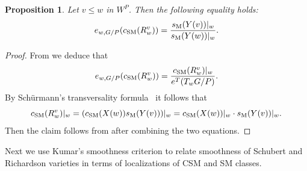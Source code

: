 \documentclass[11pt]{article}
\newtheorem{prop}[theo]{Proposition}
\theoremstyle{definition}
\numberwithin{equation}{section}
\newcommand{\csm}{c_{\mathrm{SM}}}
\newcommand{\ssm}{s_{\mathrm{M}}}
\begin{document}
\begin{prop}\label{prop:eqmult} Let $v \le w$ in $W^P$. Then the following equality holds:
	\[e_{w,G/P} (\csm(R_w^{v}))= \frac{\ssm(Y(v))|_w}{\ssm(Y(w))|_w} \/. \]
\end{prop}
\begin{proof} From  we deduce that 
	\[ e_{w,G/P} (\csm(R_w^{v}))= \frac{\csm(R_w^v)|_w}{e^T (T_w G/P)} \/. \]
	By Sch{\"u}rmann's transversality formula~\cite{schurmann:transversality,AMSS:shadows}
	it follows that 
	\[\csm(R_w^v)|_w = (\csm(X(w)) \ssm(Y(v)))|_w 
	= \csm(X(w))|_w \cdot \ssm(Y(v))|_w \/. \]
	Then the claim follows from  after combining the two equations. 
\end{proof}

Next we use {Kumar's smoothness criterion} 
to relate smoothness of Schubert and Richardson varieties in terms of localizations
of CSM and SM classes.
\end{document}
